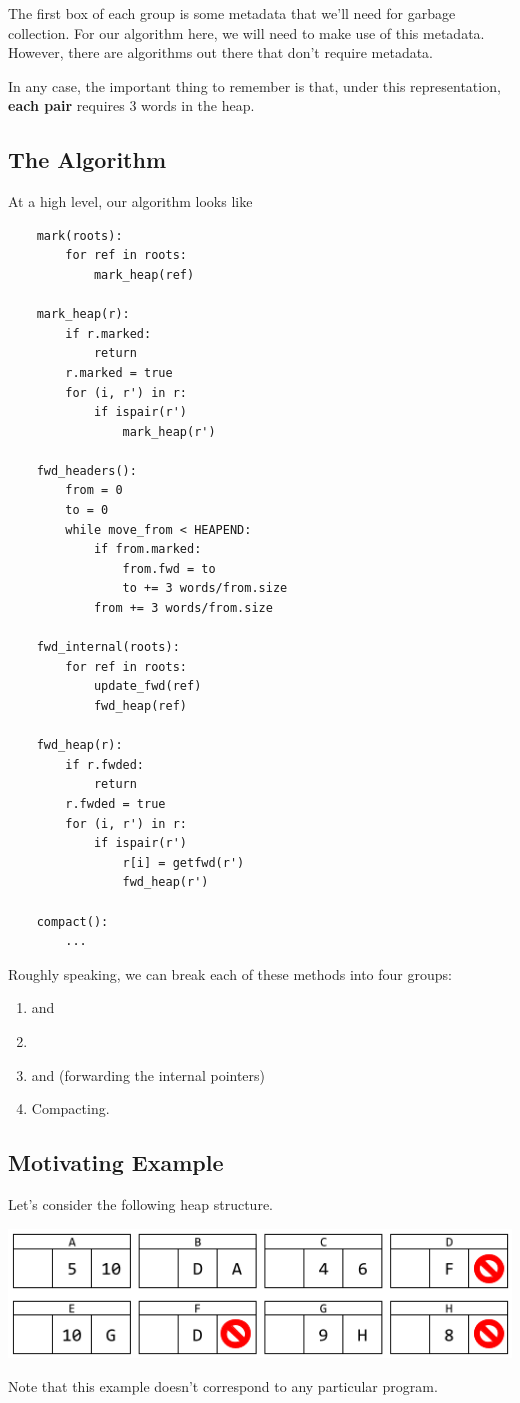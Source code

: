The first box of each group is some metadata that we'll need for garbage collection. For our algorithm here, we will need to make use of this metadata. However, there are algorithms out there that don't require metadata.

\bigskip 

In any case, the important thing to remember is that, under this representation, \textbf{each pair} requires 3 words in the heap. 

\subsection{The Algorithm}
At a high level, our algorithm looks like 
\begin{verbatim}
    mark(roots):
        for ref in roots:
            mark_heap(ref)
    
    mark_heap(r):
        if r.marked:
            return 
        r.marked = true 
        for (i, r') in r:
            if ispair(r')
                mark_heap(r')

    fwd_headers():
        from = 0
        to = 0
        while move_from < HEAPEND:
            if from.marked: 
                from.fwd = to 
                to += 3 words/from.size 
            from += 3 words/from.size 
    
    fwd_internal(roots):
        for ref in roots:
            update_fwd(ref)
            fwd_heap(ref)

    fwd_heap(r):
        if r.fwded: 
            return 
        r.fwded = true 
        for (i, r') in r:
            if ispair(r')
                r[i] = getfwd(r')
                fwd_heap(r')

    compact():
        ... \end{verbatim}
Roughly speaking, we can break each of these methods into four groups: 
\begin{enumerate}
    \item {} and 
    \item {}
    \item {} and  (forwarding the internal pointers)
    \item Compacting.
\end{enumerate}

\subsection{Motivating Example}
Let's consider the following heap structure.
\begin{center}
    \includegraphics[scale=0.8]{assets/GCAlg1.png}
\end{center}
Note that this example doesn't correspond to any particular program. 

